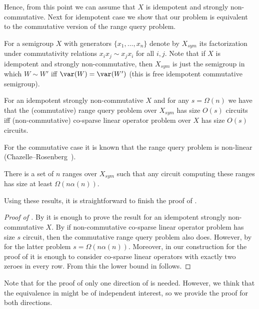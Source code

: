 Hence, from this point we can assume that $X$ is idempotent and strongly
non-commutative. Next for idempotent case we show that our problem is equivalent
to the commutative version of the range query problem.

For a semigroup $X$ with generators $\{x_1,\ldots, x_n\}$ denote by $X_{sym}$
its factorization under commutativity relations
$x_i x_j \sim x_j x_i$ for all $i,j$. Note that if $X$ is idempotent and
strongly non-commutative, then $X_{sym}$ is just the semigroup in which
$W \sim W'$ iff $\var(W)=\var(W')$ (this is free idempotent commutative
semigroup).

\begin{theorem}\label{thm:equivalence}
For an idempotent strongly non-commutative $X$ and for any $s=\Omega(n)$ we have
that the (commutative)
%
%
range query problem
over $X_{sym}$ has size $O(s)$ circuits
iff (non-commutative)
%
%
co-sparse
linear operator problem over $X$ has size $O(s)$
circuits.
\end{theorem}

%
%
%
%
%
%
%
For the commutative case it is known that
%
%
the range query
problem is non-linear
(Chazelle--Rosenberg~\cite{DBLP:journals/ijcga/ChazelleR91}).  %
\begin{theorem}\label{thm:chazelle}
	There is a set of $n$ ranges over $X_{sym}$ such that any circuit
	computing these ranges has size at least $\Omega(n \alpha(n))$.
\end{theorem}

Using these results, it is straightforward to finish the proof of
.

\begin{proof}[Proof of {}]

By  it is enough to prove the result for an idempotent strongly non-commutative $X$.
By  if non-commutative
%
%
co-sparse
linear
operator problem has size $s$ circuit, then the commutative
%
%
range query
problem also does. However, by  for the latter problem $s=\Omega(n \alpha(n))$.
Moreover, in our construction for the proof of  it
is enough to consider
%
%
co-sparse
linear operators with exactly two zeroes in every
row. From this the lower bound in  follows.
\end{proof}

Note that for the proof of  only one direction of
 is needed. However, we think that the equivalence
in  might be of independent interest, so we provide
the proof for both directions.

